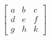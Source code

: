 \documentclass[preview]{standalone}
\begin{document}
\begin{align*}
\begin{bmatrix} a & b & c \\ d & e & f \\ g & h & k \end{bmatrix}
\end{align*}
\end{document}

